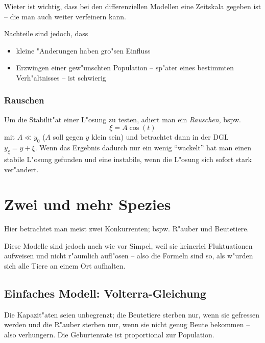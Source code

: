 \documentclass[a4paper]{book}
\begin{document}
Wieter ist wichtig, dass bei den differenziellen Modellen eine
Zeitskala gegeben ist -- die man auch weiter verfeinern kann.

Nachteile sind jedoch, dass 
\begin{itemize}
\item kleine "Anderungen haben gro"sen Einfluss
\item Erzwingen einer gew"unschten Population -- sp"ater eines
  bestimmten Verh"altnisses -- ist schwierig
\end{itemize}



\subsubsection{Rauschen}
\label{sec:rauschen}

Um die Stabilit"at einer L"osung zu testen, adiert man ein
\emph{Rauschen}, bspw.
\begin{equation*}
  \xi = A \cos(t)
\end{equation*}
mit $A \ll y_0$ ($A$ soll gegen $y$ klein sein) und betrachtet dann in
der DGL $y_\xi = y + \xi$. Wenn das Ergebnis dadurch nur ein wenig
"`wackelt"' hat man einen stabile L"osung gefunden und eine instabile,
wenn die L"osung sich sofort stark ver"andert.







\section{Zwei und mehr Spezies}
\label{sec:zwei_und_mehr_spezies}

Hier betrachtet man meist zwei Konkurrenten; bspw. R"auber und
Beutetiere.

Diese Modelle sind jedoch nach wie vor Simpel, weil sie keinerlei
Fluktuationen aufweisen und nicht r"aumlich aufl"osen -- also die
Formeln sind so, als w"urden sich alle Tiere an einem Ort aufhalten.

\subsection{Einfaches Modell: Volterra-Gleichung}
\label{sec:einf_modell:_volt_gleich}

Die Kapazit"aten seien unbegrenzt; die Beutetiere sterben nur, wenn
sie gefressen werden und die R"auber sterben nur, wenn sie nicht genug
Beute bekommen -- also verhungern. Die Geburtenrate ist proportional
zur Population. 
\end{document}
